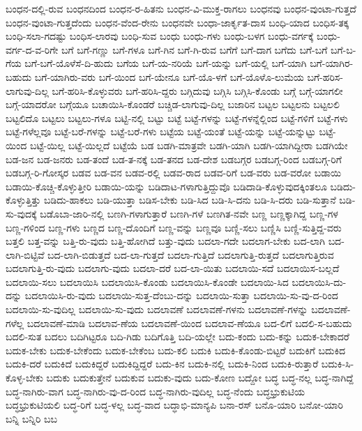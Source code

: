 {ಬಂಧನ-ದಲ್ಲಿ-ರುವ
ಬಂಧನದಿಂದ
ಬಂಧನ-ರ-ಹಿತನು
ಬಂಧನ-ವಿ-ಮುಕ್ತ-ರಾಗಲು
ಬಂಧನವು
ಬಂಧನ-ವುಂಟಾ-ಗುತ್ತದೆ
ಬಂಧನ-ವುಂಟಾ-ಗುತ್ತದೆಂದು
ಬಂಧನ-ವೆಂದ-ರೇನು
ಬಂಧನವೇ
ಬಂಧಾ-ಜಾರ್ಕೃತ-ದಾಸ
ಬಂಧಿ-ಯಾದ
ಬಂಧಿಸ-ತಕ್ಕ
ಬಂಧಿ-ಸಲಾ-ಗದಷ್ಟು
ಬಂಧಿಸ-ಲಾರವು
ಬಂಧಿ-ಸುವ
ಬಂಧು
ಬಂಧು-ಗಳು
ಬಂಧು-ಬಳಗ
ಬಂಧು-ವರ್ಗಕ್ಕೆ
ಬಂಧು-ವರ್ಗ-ದ-ವ-ರಿಗೇ
ಬಗೆ
ಬಗೆ-ಗಣ್ಣು
ಬಗೆ-ಗಳೂ
ಬಗೆ-ಗಿನ
ಬಗೆ-ಗಿ-ರುವ
ಬಗೆಗೆ
ಬಗೆ-ದಾಗ
ಬಗೆದು
ಬಗೆ-ಬಗೆ
ಬಗೆ-ಬ-ಗೆಯ
ಬಗೆ-ಬಗೆ-ಯೊಳೆಸೆ-ದಿ-ಹುದು
ಬಗೆಯ
ಬಗೆ-ಯ-ನರಿಯೆ
ಬಗೆ-ಯನ್ನು
ಬಗೆ-ಯಲ್ಲಿ
ಬಗೆ-ಯಾಗಿ
ಬಗೆ-ಯಾಗಿರ-ಬಹುದು
ಬಗೆ-ಯಾಗಿರು-ವರು
ಬಗೆ-ಯಿಂದ
ಬಗೆ-ಯೇನೂ
ಬಗೆ-ಯೊ-ಳಗೆ
ಬಗೆ-ಯೊಳೊ-ಲುಮೆಯ
ಬಗೆ-ಹರಿಸ-ಲಾಗುವು-ದಿಲ್ಲ
ಬಗೆ-ಹರಿಸಿ-ಕೊಳ್ಳುವರು
ಬಗೆ-ಹರಿಸಿ-ದ್ದರು
ಬಗ್ಗಿದುವು
ಬಗ್ಗಿಸಿ
ಬಗ್ಗಿಸಿ-ಕೊಂಡು
ಬಗ್ಗೆ
ಬಗ್ಗೆ-ಯಾಗಲೀ
ಬಗ್ಗೆ-ಯಾದರೋ
ಬಗ್ಗೆಯೂ
ಬಚಾಯಿಸಿ-ಕೊಂಡರೆ
ಬಚ್ಚಿಡ-ಲಾಗುವು-ದಿಲ್ಲ
ಬಜಾರಿನ
ಬಟ್ಟಲ
ಬಟ್ಟಲನು
ಬಟ್ಟಲಲಿ
ಬಟ್ಟಲಿದೊ
ಬಟ್ಟಲು
ಬಟ್ಟಲು-ಗಳೂ
ಬಟ್ಟಿ-ನಲ್ಲಿ
ಬಟ್ಟು
ಬಟ್ಟೆ
ಬಟ್ಟೆ-ಗಳನ್ನು
ಬಟ್ಟೆ-ಗಳನ್ನೆಲ್ಲಿಂದ
ಬಟ್ಟೆ-ಗಳಿಗೆ
ಬಟ್ಟೆ-ಗಳು
ಬಟ್ಟೆ-ಗಳೆಲ್ಲವೂ
ಬಟ್ಟೆ-ಬರೆ-ಗಳನ್ನು
ಬಟ್ಟೆ-ಬರೆ-ಗಳು
ಬಟ್ಟೆಯ
ಬಟ್ಟೆ-ಯಂತೆ
ಬಟ್ಟೆ-ಯನ್ನು
ಬಟ್ಟೆ-ಯನ್ನುಟ್ಟು
ಬಟ್ಟೆ-ಯಿಂದ
ಬಟ್ಟೆ-ಯಿಲ್ಲ
ಬಟ್ಟೆ-ಯಿಲ್ಲದೆ
ಬಟ್ಟೆಯೆ
ಬಡ
ಬಡಗಿ-ಮಾತ್ರವೇ
ಬಡಗಿ-ಯಾಗಿ
ಬಡಗಿ-ಯಾಗಿದ್ದೀರಾ
ಬಡಗಿಯೇ
ಬಡ-ಜನ
ಬಡ-ಜನರು
ಬಡ-ತಂದೆ
ಬಡ-ತ-ನಕ್ಕೆ
ಬಡ-ತನದ
ಬಡ-ದೇಶ
ಬಡಬಗ್ಗರ
ಬಡಬಗ್ಗ-ರಿಂದ
ಬಡಬಗ್ಗ-ರಿಗೆ
ಬಡಬಗ್ಗ-ರಿ-ಗೋಸ್ಕರ
ಬಡವ
ಬಡ-ವನ
ಬಡವ-ರಲ್ಲಿ
ಬಡವ-ರಾದ
ಬಡವ-ರಿಗೆ
ಬಡ-ವರು
ಬಡ-ವರೋ
ಬಡಾಯಿ
ಬಡಾಯಿ-ಕೊಚ್ಚಿ-ಕೊಳ್ಳುತ್ತೀರಿ
ಬಡಾಯಿ-ಯನ್ನು
ಬಡಿದಾಟ-ಗಳಾಗುತ್ತಿದ್ದುವೊ
ಬಡಿದಾಡಿ-ಕೊಳ್ಳುವುದಕ್ಕಿಂತಲೂ
ಬಡಿದು-ಕೊಳ್ಳುತ್ತಿತ್ತು
ಬಡಿದು-ಹಾಕಲು
ಬಡಿ-ಯುತ್ತಾ
ಬಡಿಸ-ಬೇಕು
ಬಡಿ-ಸಿದ
ಬಡಿ-ಸಿ-ದನು
ಬಡಿ-ಸಿ-ದರು
ಬಡಿ-ಸುತ್ತಾನೆ
ಬಡಿ-ಸು-ವುದಕ್ಕೆ
ಬಡೊಬಾ-ಜಾರಿ-ನಲ್ಲಿ
ಬಣಗಿ-ಗಳಾಗುತ್ತಾರೆ
ಬಣಗಿ-ಗಳೆ
ಬಣಗಿತ-ನವೇ
ಬಣ್ಣ
ಬಣ್ಣಕ್ಕಾಗಿದ್ದ
ಬಣ್ಣ-ಗಳ
ಬಣ್ಣ-ಗಳಿಂದ
ಬಣ್ಣ-ಗಳು
ಬಣ್ಣದ
ಬಣ್ಣ-ದೊಂದಿಗೆ
ಬಣ್ಣ-ವನ್ನು
ಬಣ್ಣವೂ
ಬಣ್ಣಿ-ಸಲು
ಬಣ್ಣಿಸಿ
ಬಣ್ಣಿ-ಸುತ್ತಿದ್ದ-ವರು
ಬತ್ತಲಿ
ಬತ್ತ-ವನ್ನು
ಬತ್ತಿ-ರು-ವುದು
ಬತ್ತಿ-ಹೋಗಿದೆ
ಬತ್ತು-ವುದು
ಬದಲಾ-ಗದೇ
ಬದಲಾಗ-ಬೇಕು
ಬದ-ಲಾಗಿ
ಬದ-ಲಾಗಿ-ಬಿಟ್ಟಿವೆ
ಬದ-ಲಾಗಿ-ಬಿಡುತ್ತದೆ
ಬದ-ಲಾ-ಗುತ್ತದೆ
ಬದಲಾ-ಗುತ್ತಿದೆ
ಬದಲಾಗುತ್ತಿ-ರುತ್ತದೆ
ಬದಲಾಗುತ್ತಿರುವ
ಬದಲಾಗುತ್ತಿ-ರು-ವುದು
ಬದಲಾಗು-ವುದು
ಬದಲಾ-ದರೆ
ಬದ-ಲಾ-ಯಿತು
ಬದಲಾಯಿ-ಸದೆ
ಬದಲಾಯಿಸ-ಬಲ್ಲದೆ
ಬದಲಾಯಿ-ಸಲು
ಬದಲಾಯಿಸಿ
ಬದಲಾಯಿಸಿ-ಕೊಂಡು
ಬದಲಾಯಿಸಿ-ಕೊಂಡೇ
ಬದಲಾಯಿ-ಸಿದ
ಬದಲಾಯಿಸಿ-ದು-ದನ್ನು
ಬದಲಾಯಿಸಿ-ರು-ವುದು
ಬದಲಾಯಿ-ಸುತ್ತ-ದೆಂಬು-ದನ್ನು
ಬದಲಾಯಿ-ಸುತ್ತಾ
ಬದಲಾಯಿ-ಸು-ವು-ದ-ರಿಂದ
ಬದಲಾಯಿ-ಸು-ವುದಿಲ್ಲ
ಬದಲಾಯಿ-ಸು-ವುದು
ಬದಲಾವಣೆ
ಬದಲಾವಣೆ-ಗಳನು
ಬದಲಾವಣೆ-ಗಳನ್ನು
ಬದಲಾವಣೆ-ಗಳೆಲ್ಲ
ಬದಲಾವಣೆ-ಮಾಡಿ
ಬದಲಾವ-ಣೆಯ
ಬದಲಾವಣೆ-ಯಿಂದ
ಬದಲಾವ-ಣೆಯೂ
ಬದ-ಲಿಗೆ
ಬದಲಿ-ಸ-ಬಹುದು
ಬದಲಿ-ಸುತ
ಬದಲು
ಬದಿಗಿಟ್ಟರೂ
ಬದಿ-ಗಿಡು
ಬದಿಗೊತ್ತಿ
ಬದಿ-ಯಲ್ಲೇ
ಬದು-ಕಂದು
ಬದು-ಕನ್ನು
ಬದುಕ-ಬೇಕಾದರೆ
ಬದುಕ-ಬೇಕು
ಬದುಕ-ಬೇಕೆಂದು
ಬದುಕ-ಬೇಕೆಂಬ
ಬದು-ಕಲಿ
ಬದುಕಿ
ಬದುಕಿ-ಕೊಂಡು-ಬಿಟ್ಟರೆ
ಬದುಕಿಗೆ
ಬದುಕಿದ
ಬದುಕಿ-ದರೆ
ಬದುಕಿದೆ
ಬದುಕಿದ್ದರೆ
ಬದುಕಿದ್ದಿದ್ದರೆ
ಬದು-ಕಿನ
ಬದುಕಿ-ನಲ್ಲಿ
ಬದುಕಿ-ನಿಂದ
ಬದುಕಿ-ರುತ್ತಾರೆ
ಬದುಕಿ-ಸಿ-ಕೊಳ್ಳ-ಬೇಕು
ಬದುಕು
ಬದುಕುತ್ತೇನೆ
ಬದುಕುವ
ಬದುಕು-ವುದು
ಬದು-ಕೋಣ
ಬದ್ದೋ
ಬದ್ಧ
ಬದ್ಧ-ನಲ್ಲ
ಬದ್ಧ-ನಾಗಿದ್ದೆ
ಬದ್ಧ-ನಾಗಿರು-ವಾಗ
ಬದ್ಧ-ನಾಗಿರು-ವು-ದ-ರಿಂದ
ಬದ್ಧ-ನಾಗಿರು-ವುದಿಲ್ಲ
ಬದ್ಧ-ನೆಂದು
ಬದ್ಧಭ್ರುಕುಟಿಯ
ಬದ್ಧಭ್ರುಕುಟಿಯಲಿ
ಬದ್ಧ-ರಿಗೆ
ಬದ್ಧ-ಳಲ್ಲ
ಬದ್ಧ-ವಾದ
ಬದ್ಧಾಭಿ-ಮಾನ್ಯಪಿ
ಬನಾ-ರಸ್
ಬನೊ-ಯಾರಿ
ಬನೋ-ಯಾರಿ
ಬನ್ನಿ
ಬನ್ನಿರಿ
ಬಬ
}
